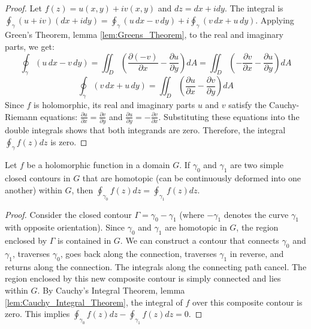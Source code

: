 \begin{proof}
    Let $f(z) = u(x,y) + i v(x,y)$ and $dz = dx + i dy$. The integral is $\oint_\gamma (u+iv)(dx+idy) = \oint_\gamma (u \, dx - v \, dy) + i \oint_\gamma (v \, dx + u \, dy)$.
    Applying Green's Theorem, lemma \ref{lem:Greens_Theorem}, to the real and imaginary parts, we get:
    $$ \oint_\gamma (u \, dx - v \, dy) = \iint_D \left(\frac{\partial(-v)}{\partial x} - \frac{\partial u}{\partial y}\right) dA = \iint_D \left(-\frac{\partial v}{\partial x} - \frac{\partial u}{\partial y}\right) dA $$
    $$ \oint_\gamma (v \, dx + u \, dy) = \iint_D \left(\frac{\partial u}{\partial x} - \frac{\partial v}{\partial y}\right) dA $$
    Since $f$ is holomorphic, its real and imaginary parts $u$ and $v$ satisfy the Cauchy-Riemann equations: $\frac{\partial u}{\partial x} = \frac{\partial v}{\partial y}$ and $\frac{\partial u}{\partial y} = -\frac{\partial v}{\partial x}$. Substituting these equations into the double integrals shows that both integrands are zero. Therefore, the integral $\oint_\gamma f(z) dz$ is zero.
\end{proof}

\begin{lemma}
    \label{lem:Deformation_Invariance}
    Let $f$ be a holomorphic function in a domain $G$. If $\gamma_0$ and $\gamma_1$ are two simple closed contours in $G$ that are homotopic (can be continuously deformed into one another) within $G$, then $\oint_{\gamma_0} f(z) dz = \oint_{\gamma_1} f(z) dz$.
\end{lemma}

\begin{proof}
    Consider the closed contour $\Gamma = \gamma_0 - \gamma_1$ (where $-\gamma_1$ denotes the curve $\gamma_1$ with opposite orientation). Since $\gamma_0$ and $\gamma_1$ are homotopic in $G$, the region enclosed by $\Gamma$ is contained in $G$. We can construct a contour that connects $\gamma_0$ and $\gamma_1$, traverses $\gamma_0$, goes back along the connection, traverses $\gamma_1$ in reverse, and returns along the connection. The integrals along the connecting path cancel. The region enclosed by this new composite contour is simply connected and lies within $G$. By Cauchy's Integral Theorem, lemma \ref{lem:Cauchy_Integral_Theorem}, the integral of $f$ over this composite contour is zero. This implies $\oint_{\gamma_0} f(z) dz - \oint_{\gamma_1} f(z) dz = 0$.
\end{proof}

